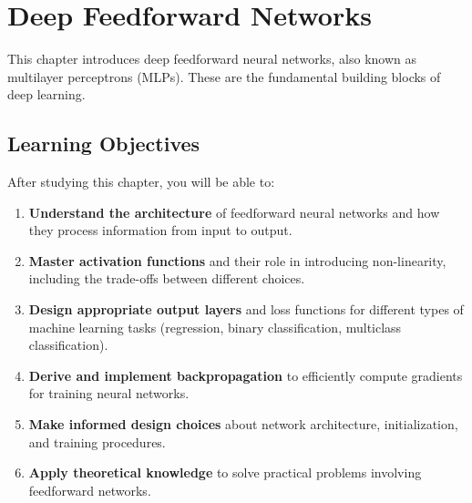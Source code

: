 
\chapter{Deep Feedforward Networks}
\label{chap:feedforward-networks}

This chapter introduces deep feedforward neural networks, also known as multilayer perceptrons (MLPs). These are the fundamental building blocks of deep learning.

\section*{Learning Objectives}
\label{sec:learning-objectives}

After studying this chapter, you will be able to:

\begin{enumerate}
    \item \textbf{Understand the architecture} of feedforward neural networks and how they process information from input to output.
    
    \item \textbf{Master activation functions} and their role in introducing non-linearity, including the trade-offs between different choices.
    
    \item \textbf{Design appropriate output layers} and loss functions for different types of machine learning tasks (regression, binary classification, multiclass classification).
    
    \item \textbf{Derive and implement backpropagation} to efficiently compute gradients for training neural networks.
    
    \item \textbf{Make informed design choices} about network architecture, initialization, and training procedures.
    
    \item \textbf{Apply theoretical knowledge} to solve practical problems involving feedforward networks.
\end{enumerate}














